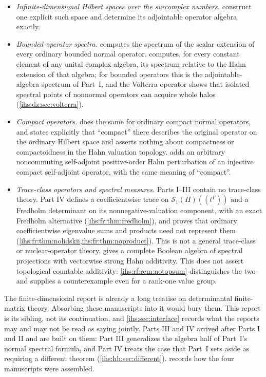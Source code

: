 \documentclass[11pt,a4paper]{article}
\numberwithin{equation}{section}
\theoremstyle{definition}
\theoremstyle{remark}
\newcommand{\SH}{\mathcal S_1(H)}
\begin{document}
\begin{itemize}
\item \emph{Infinite-dimensional Hilbert spaces over the surcomplex
 numbers.}  construct one
 explicit such space and determine its adjointable operator algebra
 exactly.
\item \emph{Bounded-operator spectra.}  computes
 the spectrum of the scalar extension of every ordinary bounded normal
 operator.  computes, for every constant element of
 any unital complex algebra, its spectrum relative to the Hahn extension of
 that algebra; for bounded operators this is the adjointable-algebra
 spectrum of Part~I, and the Volterra operator shows that isolated spectral
 points of nonnormal operators can acquire whole halos
 (\cref{ihs:dz:sec:volterra}).
\item \emph{Compact operators.}  does the same for
 ordinary compact normal operators, and states explicitly that
 ``compact'' there describes the original operator on the ordinary Hilbert
 space and asserts nothing about compactness or compactoidness in the Hahn
 valuation topology.  adds an arbitrary
 noncommuting self-adjoint positive-order Hahn perturbation of an injective
 compact self-adjoint operator, with the same meaning of ``compact''.
\item \emph{Trace-class operators and spectral measures.}
 Parts I--III contain no trace-class theory. Part IV defines a
 coefficientwise trace on $\SH((t^\Gamma))$ and a Fredholm determinant on
 its nonnegative-valuation component, with an exact Fredholm alternative
 (\cref{ihs:fr:thm:fredholm}), and proves that ordinary coefficientwise
 eigenvalue sums and products need not represent them
 (\cref{ihs:fr:thm:nolidskii,ihs:fr:thm:noproduct}). This is not a general
 trace-class or nuclear-operator theory.  gives a
 complete Boolean algebra of spectral projections with vectorwise strong
 Hahn additivity. This does not assert topological countable additivity:
 \cref{ihs:rf:rem:notopsum} distinguishes the two and supplies a
 counterexample even for a rank-one value group.
\end{itemize}

The finite-dimensional report is already a long treatise on determinantal
finite-matrix theory. Absorbing these manuscripts into it would bury them.
This report is its sibling, not its continuation, and
\cref{ihs:sec:interface} records what the reports may and may not be read
as saying jointly. Parts III and IV arrived after Parts I and II and are
built on them: Part III generalizes the algebra half of Part~I's normal
spectral formula, and Part IV treats the case that Part~I sets aside as
requiring a different theorem (\cref{ihs:hh:sec:different}).
 records how the four manuscripts were assembled.
\end{document}

